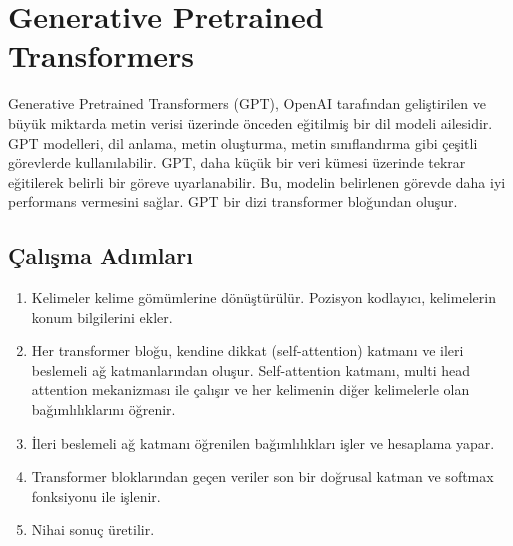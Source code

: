 \section{Generative Pretrained Transformers}
Generative Pretrained Transformers (GPT), OpenAI tarafından geliştirilen ve büyük miktarda metin verisi üzerinde önceden eğitilmiş bir dil modeli ailesidir. GPT modelleri, dil anlama, metin oluşturma, metin sınıflandırma gibi çeşitli görevlerde kullanılabilir.  GPT, daha küçük bir veri kümesi üzerinde tekrar eğitilerek belirli bir göreve uyarlanabilir. Bu, modelin belirlenen görevde daha iyi performans vermesini sağlar. GPT bir dizi transformer bloğundan oluşur.

\subsection{Çalışma Adımları}
\begin{enumerate}
	\item Kelimeler kelime gömümlerine dönüştürülür. Pozisyon kodlayıcı, kelimelerin konum bilgilerini ekler.
	\item Her transformer bloğu, kendine dikkat (self-attention) katmanı ve ileri beslemeli ağ katmanlarından oluşur.  Self-attention katmanı, multi head attention mekanizması ile çalışır ve her kelimenin diğer kelimelerle olan bağımlılıklarını öğrenir.
	\item İleri beslemeli ağ katmanı öğrenilen bağımlılıkları işler ve hesaplama yapar.
	\item Transformer bloklarından geçen veriler son bir doğrusal katman ve softmax fonksiyonu ile işlenir.
	\item Nihai sonuç üretilir.
\end{enumerate}

\newpage
